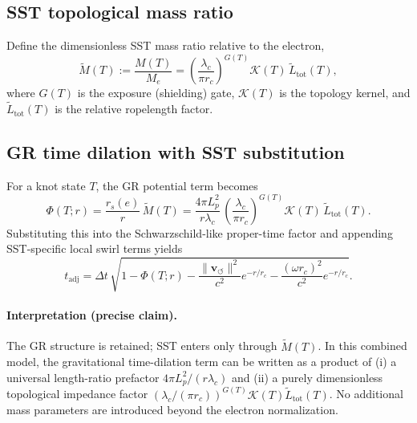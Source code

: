 \documentclass[11pt, a4paper]{article}
\newcommand{\vswirl}{\mathbf{v}_{\!\boldsymbol{\circlearrowleft}}}
\newcommand{\rc}{r_c}
\begin{document}
        \subsection{SST topological mass ratio}
            Define the dimensionless SST mass ratio relative to the electron,
            \begin{equation}
                \boxed{
                    \tilde{M}(T) := \frac{M(T)}{M_e}
                    = \left( \frac{\lambda_c}{\pi \rc} \right)^{G(T)} \mathcal{K}(T)\,\tilde{L}_{\text{tot}}(T),
                }
            \end{equation}
            where $G(T)$ is the exposure (shielding) gate, $\mathcal{K}(T)$ is the topology kernel, and
            $\tilde{L}_{\text{tot}}(T)$ is the relative ropelength factor.
        
        \subsection{GR time dilation with SST substitution}
            For a knot state $T$, the GR potential term becomes
            \begin{equation}
                \Phi(T;r)=\frac{r_s(e)}{r}\,\tilde{M}(T)
                =
                \boxed{
                    \frac{4\pi L_p^2}{r\lambda_c}\,
                    \left( \frac{\lambda_c}{\pi \rc} \right)^{G(T)} \mathcal{K}(T)\,\tilde{L}_{\text{tot}}(T).
                }
            \end{equation}
            Substituting this into the Schwarzschild-like proper-time factor and appending SST-specific local swirl terms yields
            \begin{equation}
                t_{\mathrm{adj}}
                =
                \Delta t\,
                \sqrt{
                    1-\Phi(T;r)
                    -\frac{\lVert \vswirl \rVert^2}{c^2}e^{-r/\rc}
                    -\frac{(\omega \rc)^2}{c^2}e^{-r/\rc}
                }.
            \end{equation}
            
            \paragraph{Interpretation (precise claim).}
                The GR structure is retained; SST enters only through $\tilde{M}(T)$.
                In this combined model, the gravitational time-dilation term can be written as a product of (i) a universal length-ratio prefactor
                $4\pi L_p^2/(r\lambda_c)$ and (ii) a purely dimensionless topological impedance factor
                $\left(\lambda_c/(\pi \rc)\right)^{G(T)}\mathcal{K}(T)\tilde{L}_{\text{tot}}(T)$.
                No additional mass parameters are introduced beyond the electron normalization.
\end{document}
